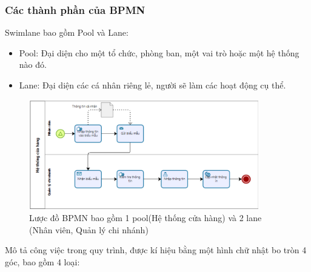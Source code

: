 \subsubsection{Các thành phần của BPMN}
Swimlane bao gồm Pool và Lane:
\begin{itemize}
    \item Pool: Đại diện cho một tổ chức, phòng ban, một vai trò hoặc một hệ thống nào đó.
    \item Lane: Đại diện các cá nhân riêng lẻ, người sẽ làm các hoạt động cụ thể.
\end{itemize}
\newpage
\begin{figure}[!htp]
    \centering
    \includegraphics[width=10cm]{img/theory/BPMN/BPMN_swimlane.png}
    \newline
    \caption{Lược đồ BPMN bao gồm 1 pool(Hệ thống cửa hàng) và 2 lane (Nhân viên, Quản lý chi nhánh)}
\end{figure}
Mô tả công việc trong quy trình, được kí hiệu bằng một hình chữ nhật bo tròn 4 góc, bao gồm 4 loại:
